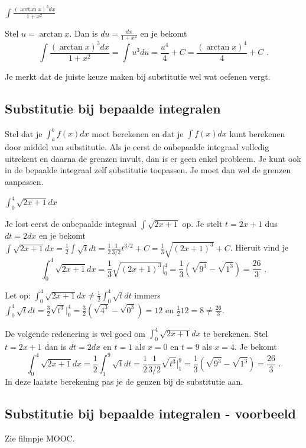 \begin{voorbeeld}
		$\int \frac{(\arctan x)^3dx}{1+x^2}$
	
	Stel $u=\arctan x$.
	Dan is $du=\frac{dx}{1+x^2}$ en je bekomt
	\[
	\int \frac{(\arctan x)^3dx}{1+x^2}=\int u^3du=\frac{u^4}{4}+C=\frac{(\arctan x)^4}{4}+C \text { .}
	\]
\end{voorbeeld}
	
Je merkt dat de juiste keuze maken bij substitutie wel wat oefenen vergt.

\subsection{Substitutie bij bepaalde integralen}

Stel dat je $\int ^b_a f(x)dx$ moet berekenen en dat je $\int f(x)dx$ kunt berekenen door middel van substitutie.
Als je eerst de onbepaalde integraal volledig uitrekent en daarna de grenzen invult, dan is er geen enkel probleem.
Je kunt ook in de bepaalde integraal zelf substitutie toepassen.
Je moet dan wel de grenzen aanpassen.


\begin{voorbeeld}
	$\int ^4_0 \sqrt{2x+1}dx$

Je lost eerst de onbepaalde integraal $\int \sqrt{2x+1}$ op.
Je stelt $t=2x+1$ dus $dt=2dx$ en je bekomt $\int \sqrt {2x+1} dx=\frac{1}{2} \int \sqrt {t} dt=\frac {1}{2} \frac{1}{3/2} t^{3/2}+C=\frac{1}{3} \sqrt {(2x+1)^3}+C$.
Hieruit vind je
\[
\int ^4_0 \sqrt {2x+1} dx=\frac{1}{3} \sqrt {(2x+1)^3}\vert ^4_0=\frac{1}{3}\left( \sqrt{9^3} - \sqrt{1^3} \right)=\frac{26}{3} \text { .}
\]

Let op: $\int ^4_0 \sqrt {2x+1}dx \neq \frac{1}{2} \int ^4_0 \sqrt {t} dt$ immers $\int ^4_0 \sqrt {t} dt=\frac{3}{2}\sqrt {t^3}\vert ^4_0=\frac{3}{2}\left( \sqrt {4^3}-\sqrt {0^3} \right)=12$ en $\frac{1}{2}12=8\neq \frac{26}{3}$.

De volgende redenering is wel goed om $\int ^4_0 \sqrt {2x+1}dx$ te berekenen.
Stel $t=2x+1$ dan is $dt=2dx$ en $t=1$ als $x=0$ en $t=9$ als $x=4$.
Je bekomt
\[
\int ^4_0 \sqrt{2x+1}dx = \frac{1}{2} \int ^9_1 \sqrt {t} dt= \frac{1}{2} \frac{1}{3/2} \sqrt {t^3} \vert^9_1=\frac{1}{3} \left( \sqrt{9^3}-\sqrt{1^3} \right)=\frac{26}{3} \text { .}
\]
In deze laatste berekening pas je de genzen bij de substitutie aan.

\end{voorbeeld}

\subsection{Substitutie bij bepaalde integralen - voorbeeld}
Zie filmpje MOOC.

